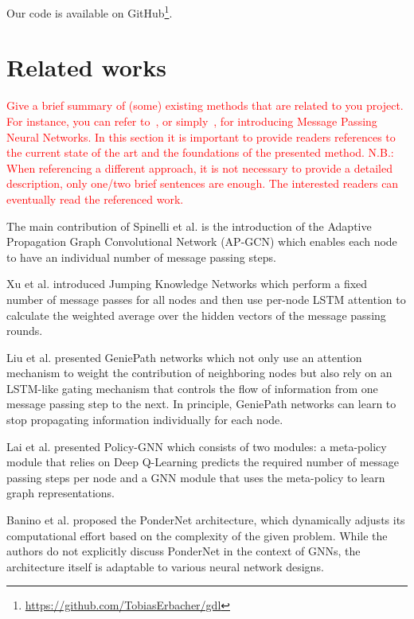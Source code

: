 \documentclass{gdl}
\begin{document}
Our code is available on GitHub\footnote{\url{https://github.com/TobiasErbacher/gdl}}.

\section{Related works}

\textcolor{red}{Give a brief summary of (some) existing methods that are related to you project. For instance, you can refer to~\citet{gilmer2017neural}, or simply~\cite{gilmer2017neural}, for introducing Message Passing Neural Networks. In this section it is important to provide readers references to the current state of the art and the foundations of the presented method. 
N.B.: When referencing a different approach, it is not necessary to provide a detailed description, only one/two brief sentences are enough. The interested readers can eventually read the referenced work. }


The main contribution of Spinelli et al. is the introduction of the Adaptive Propagation Graph Convolutional Network (AP-GCN) which enables each node to have an individual number of message passing steps.

Xu et al. \cite{xu2018} introduced Jumping Knowledge Networks which perform a fixed number of message passes for all nodes and then use per-node LSTM attention to calculate the weighted average over the hidden vectors of the message passing rounds.   

Liu et al. \cite{liu2019} presented GeniePath networks which not only use an attention mechanism to weight the contribution of neighboring nodes but also rely on an LSTM-like gating mechanism that controls the flow of information from one message passing step to the next. In principle, GeniePath networks can learn to stop propagating information individually for each node.

Lai et al. \cite{lai2020} presented Policy-GNN which consists of two modules: a meta-policy module that relies on Deep Q-Learning predicts the required number of message passing steps per node and a GNN module that uses the meta-policy to learn graph representations.

Banino et al. \cite{banino2021} proposed the PonderNet architecture, which dynamically adjusts its computational effort based on the complexity of the given problem. While the authors do not explicitly discuss PonderNet in the context of GNNs, the architecture itself is adaptable to various neural network designs.
\end{document}
